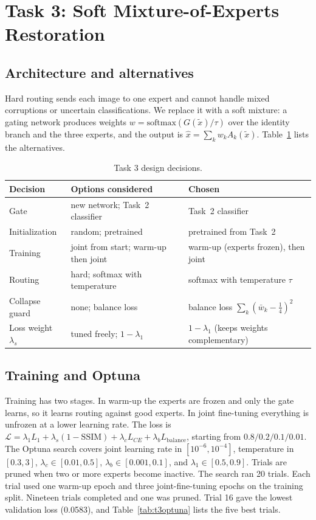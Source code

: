 \documentclass[conference]{IEEEtran}
\begin{document}
\section{Task 3: Soft Mixture-of-Experts Restoration}
\subsection{Architecture and alternatives}
Hard routing sends each image to one expert and cannot handle mixed corruptions or uncertain
classifications. We replace it with a soft mixture: a gating network produces weights
$w=\mathrm{softmax}(G(\tilde x)/\tau)$ over the identity branch and the three experts, and the output is
$\hat x=\sum_k w_k A_k(\tilde x)$. Table~\ref{tab:t3choices} lists the alternatives.

\begin{table}[t]
\centering
\caption{Task 3 design decisions.}
\label{tab:t3choices}
\begin{tabular}{@{}p{2.2cm}p{2.9cm}p{2.6cm}@{}}
\toprule
Decision & Options considered & Chosen \\
\midrule
Gate & new network; Task~2 classifier & Task~2 classifier \\
Initialization & random; pretrained & pretrained from Task~2 \\
Training & joint from start; warm-up then joint & warm-up (experts frozen), then joint \\
Routing & hard; softmax with temperature & softmax with temperature $\tau$ \\
Collapse guard & none; balance loss & balance loss $\sum_k(\bar w_k-\tfrac14)^2$ \\
Loss weight $\lambda_s$ & tuned freely; $1-\lambda_1$ & $1-\lambda_1$ (keeps weights complementary) \\
\bottomrule
\end{tabular}
\end{table}

\subsection{Training and Optuna}
Training has two stages. In warm-up the experts are frozen and only the gate learns, so it learns
routing against good experts. In joint fine-tuning everything is unfrozen at a lower learning rate. The
loss is $\mathcal{L}=\lambda_1L_1+\lambda_s(1-\mathrm{SSIM})+\lambda_cL_{CE}+\lambda_bL_{\mathrm{balance}}$,
starting from $0.8/0.2/0.1/0.01$. The Optuna search covers joint learning rate in $[10^{-6},10^{-4}]$, temperature
in $[0.3,3]$, $\lambda_c\in[0.01,0.5]$, $\lambda_b\in[0.001,0.1]$, and $\lambda_1\in[0.5,0.9]$. Trials are pruned
when two or more experts become inactive. The search ran 20 trials. Each trial used one warm-up epoch and
three joint-fine-tuning epochs on the training split. Nineteen trials completed and one was pruned. Trial 16
gave the lowest validation loss (0.0583), and Table~\ref{tab:t3optuna} lists the five best trials.
\end{document}
